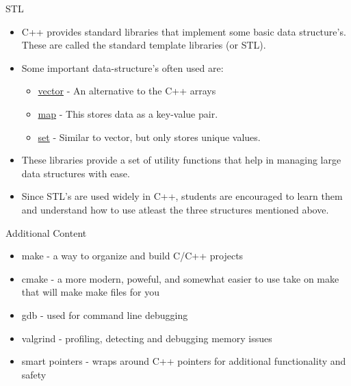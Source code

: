 \documentclass[aspectratio=169]{beamer}
\begin{document}
\begin{frame}[fragile]{STL}
    \begin{itemize}
        \item C++ provides standard libraries that implement some basic data structure's. These are called the standard template libraries (or STL).
        \item Some important data-structure's often used are:
        \begin{itemize}
            \item \href{http://www.cplusplus.com/reference/vector/vector/}{vector} - An alternative to the C++ arrays
            \item \href{http://www.cplusplus.com/reference/map/map/}{map} - This stores data as a key-value pair.
            \item \href{http://www.cplusplus.com/reference/set/set/}{set} - Similar to vector, but only stores unique values.
        \end{itemize}
        \item These libraries provide a set of utility functions that help in managing large data structures with ease.
        \item Since STL's are used widely in C++, students are encouraged to learn them and understand how to use atleast the three structures mentioned above.
    \end{itemize}
\end{frame}

\begin{frame}[fragile]{Additional Content}
    \begin{itemize}
        \item make - a way to organize and build C/C++ projects
        \item cmake - a more modern, poweful, and somewhat easier to use take on make that will make make files for you
        \item gdb - used for command line debugging
        \item valgrind - profiling, detecting and debugging memory issues
        \item smart pointers - wraps around C++ pointers for additional functionality and safety
    \end{itemize}
\end{frame}
\end{document}
